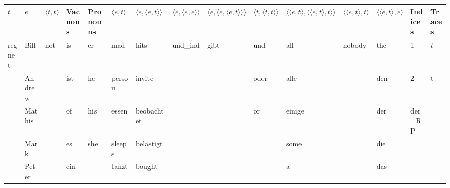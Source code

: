 \clearpage
\scriptsize
\begin{center}
\begin{tabular}{lllllllllllllll}
\toprule
   $t$ &        $e$ & $\langle t, t\rangle$ & Vacuous & Pronouns & $\langle e, t\rangle$ & $\langle e, \langle e, t\rangle\rangle$ & $\langle e, \langle e, e\rangle\rangle$ & $\langle e, \langle e, \langle e, t\rangle\rangle\rangle$ & $\langle t, \langle t, t\rangle\rangle$ & $\langle \langle e, t\rangle, \langle \langle e, t\rangle, t\rangle\rangle$ & $\langle \langle e, t\rangle, t\rangle$ & $\langle \langle e, t\rangle, e\rangle$ &  Indices & Traces \\
\midrule
regnet &       Bill &                   not &      is &       er &                   mad &                                    hits &                               und_{ind} &                                               gibt &                                     und &                                                all &                                  nobody &                                     the &        1 &    $t$ \\
       &     Andrew &                       &     ist &       he &                person &                                  invite &                                         &                                                    &                                    oder &                                               alle &                                         &                                     den &        2 &      t \\
       &     Mathis &                       &      of &      his &                 essen &                              beobachtet &                                         &                                                    &                                      or &                                             einige &                                         &                                     der & der_{RP} &        \\
       &       Mark &                       &      es &      she &                sleeps &                               belästigt &                                         &                                                    &                                         &                                               some &                                         &                                     die &          &        \\
       &      Peter &                       &     ein &          &                 tanzt &                                  bought &                                         &                                                    &                                         &                                                  a &                                         &                                     das &          &        \\

\end{tabular}
\end{center}
